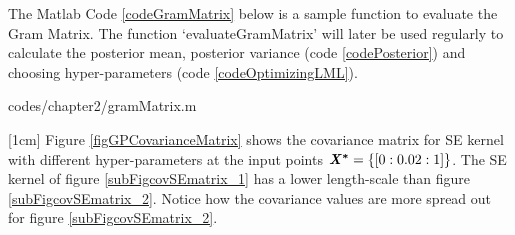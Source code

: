 The Matlab Code \ref{codeGramMatrix} below is a sample function to evaluate the Gram Matrix. The function  `evaluateGramMatrix' will later be used regularly to calculate the posterior mean, posterior variance (code \ref{codePosterior}) and choosing hyper-parameters (code \ref{codeOptimizingLML}). 


\begin{mdframed}[hidealllines=true,backgroundcolor=lightgray!20]

                    {codes/chapter2/gramMatrix.m}
\end{mdframed}

[1cm]
Figure \ref{figGPCovarianceMatrix} shows the covariance matrix for SE kernel with different hyper-parameters at the input points $\bm{\mathit{X^{*}}} = \{[0:0.02:1]\}$. The SE kernel of figure \ref{subFigcovSEmatrix_1} has a lower length-scale than figure \ref{subFigcovSEmatrix_2}. Notice how the covariance values are more spread out for figure \ref{subFigcovSEmatrix_2}.


